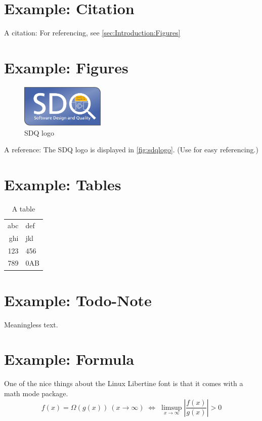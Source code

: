 \section{Example: Citation}
\label{sec:Introduction:Citation}
A citation: \cite{becker2008a} For referencing, see \autoref{sec:Introduction:Figures}

\section{Example: Figures}
\label{sec:Introduction:Figures}
\begin{figure}[h]
\centering
\includegraphics[width=4cm]{logos/sdqlogo}
\caption{SDQ logo}
\label{fig:sdqlogo}
\end{figure}

A reference: The SDQ logo is displayed in \autoref{fig:sdqlogo}. 
(Use  for easy referencing.) 

\section{Example: Tables}
\label{sec:Introduction:Tables}
\begin{table}[h]
\centering
\begin{tabular}{r l}
\toprule
abc & def\\
ghi & jkl\\
\midrule
123 & 456\\
789 & 0AB\\
\bottomrule
\end{tabular}
\caption{A table}
\label{tab:atable}
\end{table}

\section{Example: Todo-Note}
Meaningless text.

\section{Example: Formula}
One of the nice things about the Linux Libertine font is that it comes with
a math mode package.
\begin{displaymath}
f(x)=\Omega(g(x))\ (x\rightarrow\infty)\;\Leftrightarrow\;
\limsup_{x \to \infty} \left|\frac{f(x)}{g(x)}\right|> 0
\end{displaymath}

